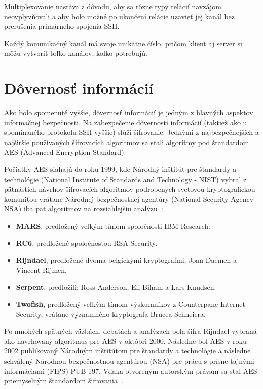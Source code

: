 Multiplexovanie nastáva z dôvodu, aby sa rôzne typy relácií navzájom neovplyvňovali a aby bolo možné po ukončení relácie
uzavieť jej kanál bez prerušenia primárneho spojenia SSH.

Každý komunikačný kanál má svoje unikátne číslo, pričom klient aj server si môžu vytvoriť toľko kanálov, koľko potrebujú.

\section{Dôvernosť informácií}\label{sec:dovernost-informacii}

Ako bolo spomenuté vyššie, dôvernosť informácií je jedným z hlavných aspektov informačnej bezpečnosti.
Na zabezpečenie dôvernosti informácií (taktiež ako u spomínaného protokolu SSH vyššie) slúži šifrovanie.
Jednými z najbezpečnejších a najširšie používaných šifrovacích algoritmov sa stali algoritmy pod štandardom AES (Advanced Encryption Standard).

Počiatky AES siahajú do roku 1999, kde Národný inštitút pre štandardy a technológie (National Institute of Standards and Technology -
NIST) vybral z pätnástich návrhov šifrovacích algoritmov podrobených svetovou kryptografickou komunitou vrátane Národnej
bezpečnostnej agentúry (National Security Agency - NSA) iba päť algoritmov na rozsiahlejšiu analýzu~\cite{AdvancedEncryptionStandard}:

\begin{itemize}
    \item \textbf{MARS}, predložený veľkým tímom spoločnosti IBM Research.
    \item \textbf{RC6}, predložené spoločnosťou RSA Security.
    \item \textbf{Rijndael}, predložené dvoma belgickými kryptografmi, Joan Daemen a Vincent Rijmen.
    \item \textbf{Serpent}, predložili: Ross Anderson, Eli Biham a Lars Knudsen.
    \item \textbf{Twofish}, predložený veľkým tímom výskumníkov z Counterpane Internet Security, vrátane významného kryptografa Brucea Schneiera.
\end{itemize}

Po mnohých spätných väzbách, debatách a analýzach bola šifra Rijndael vybraná ako navrhovaný algoritmus pre AES v
októbri 2000.
Následne bol AES v roku 2002 publikovaný Národným inštitútom pre štandardy a technológie a následne schválený Národnou bezpečnostnou
agentúrou (NSA) pre prácu s prísne tajnými informáciami (FIPS) PUB 197.
Vďaka otvoreným autorským právam sa stal AES priemyselným štandardom šifrovania~\cite{UnderstandingAes}.

